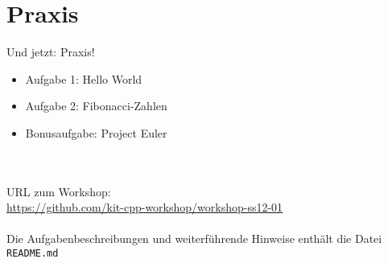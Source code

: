 \section{Praxis}
\begin{frame}[fragile]{Und jetzt: Praxis!}
	\begin{itemize}
		\item Aufgabe 1: Hello World
		\item Aufgabe 2: Fibonacci-Zahlen
		\item Bonusaufgabe: Project Euler
	\end{itemize}
	\ \\
	\ \\
	URL zum Workshop: \\
	\large{\url{https://github.com/kit-cpp-workshop/workshop-ss12-01}} \\
	\ \\
	Die Aufgabenbeschreibungen und weiterführende Hinweise enthält die Datei \verb|README.md|\\
\end{frame}
